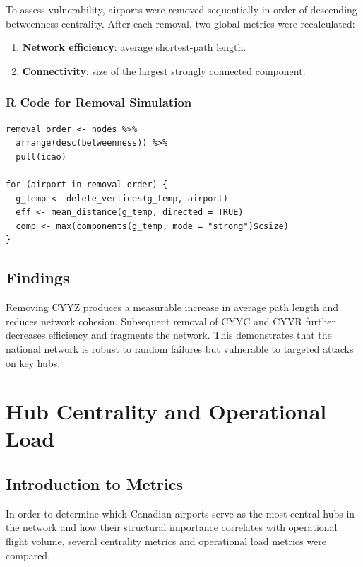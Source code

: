 \documentclass[9pt]{article}
\begin{document}
To assess vulnerability, airports were removed sequentially in order of descending betweenness centrality. After each removal, two global metrics were recalculated:

\begin{enumerate}[label=\arabic*.]
    \item \textbf{Network efficiency}: average shortest-path length.
    \item \textbf{Connectivity}: size of the largest strongly connected component.
\end{enumerate}

\subsubsection{R Code for Removal Simulation}

\begin{verbatim}
removal_order <- nodes %>%
  arrange(desc(betweenness)) %>%
  pull(icao)

for (airport in removal_order) {
  g_temp <- delete_vertices(g_temp, airport)
  eff <- mean_distance(g_temp, directed = TRUE)
  comp <- max(components(g_temp, mode = "strong")$csize)
}
\end{verbatim}

\subsection{Findings}

Removing CYYZ produces a measurable increase in average path length and reduces network cohesion. Subsequent removal of CYYC and CYVR further decreases efficiency and fragments the network. This demonstrates that the national network is robust to random failures but vulnerable to targeted attacks on key hubs.

\section{Hub Centrality and Operational Load}

\subsection{Introduction to Metrics}

In order to determine which Canadian airports serve as the most central hubs in the network and how their structural importance correlates with operational flight volume, several centrality metrics and operational load metrics were compared.
\end{document}
